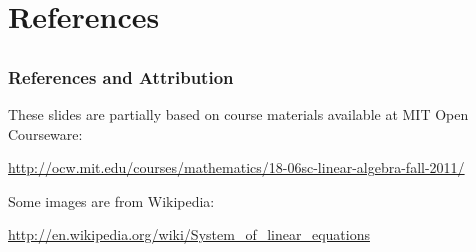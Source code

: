 \documentclass[compress]{beamer}
\newcommand{\black}[1]{{\color{black}#1}}
\begin{document}

\section{References}
\subsection*{}

\begin{frame}
\frametitle{References and Attribution}

\small

These slides are partially based on course materials available at MIT Open Courseware:

\vspace{.5cm}
\black{\url{http://ocw.mit.edu/courses/mathematics/18-06sc-linear-algebra-fall-2011/}}


\vspace{1cm}

Some images are from Wikipedia:

\vspace{.5cm}
\black{\url{http://en.wikipedia.org/wiki/System_of_linear_equations}}


\end{frame}
\end{document}
